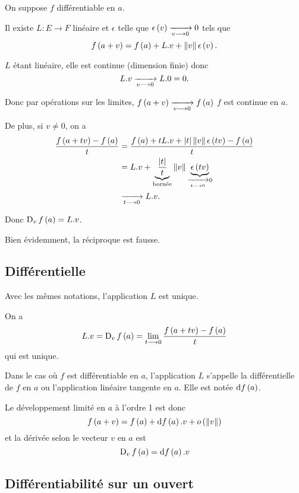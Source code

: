\begin{dem}
On suppose \(f\) différentiable en \(a\).

Il existe \(L:E\to F\) linéaire et \(\epsilon\) telle que \(\epsilon\left(v\right)\xrightarrow[v\longrightarrow0]{}0\) tels que \[f\paren{a+v}=f\paren{a}+L.v+\norme{v}\epsilon\paren{v}.\]

\(L\) étant linéaire, elle est continue (dimension finie) donc \[L.v\xrightarrow[v\longrightarrow0]{}L.0=0.\]

Donc par opérations sur les limites, \(f\left(a+v\right)\xrightarrow[v\longrightarrow0]{}f\left(a\right)\) \ie \(f\) est continue en \(a\).

De plus, si \(v\not=0\), on a \[\begin{aligned}
\dfrac{f\paren{a+tv}-f\paren{a}}{t}&=\dfrac{f\paren{a}+tL.v+\abs{t}\norme{v}\epsilon\paren{tv}-f\paren{a}}{t} \\
&=L.v+\underbrace{\dfrac{\abs{t}}{t}}_{\text{bornée}}\norme{v}\underbrace{\epsilon\paren{tv}}_{\tendqd{t\to0}0} \\
&\tendqd{t\to0}L.v.
\end{aligned}\]

Donc \(\operatorname{D}_{v}f\left(a\right)=L.v\).
\end{dem}

Bien évidemment, la réciproque est fausse.

\subsection{Différentielle}

\begin{prop}
Avec les mêmes notations, l'application \(L\) est unique.
\end{prop}

\begin{dem}
On a \[L.v=\operatorname{D}_{v}f\left(a\right)=\lim_{t\longrightarrow0}\dfrac{f\left(a+tv\right)-f\left(a\right)}{t}\] qui est unique.
\end{dem}

Dans le cas où \(f\) est différentiable en \(a\), l'application \(L\) s'appelle la différentielle de \(f\) en \(a\) ou l'application linéaire tangente en \(a\). Elle est notée \(\odif{f}\paren{a}\).

Le développement limité en \(a\) à l'ordre 1 est donc \[f\paren{a+v}=f\paren{a}+\odif{f}\paren{a}.v+\o{\norme{v}}\] et la dérivée selon le vecteur \(v\) en \(a\) est \[\vdv{v}{f}\paren{a}=\odif{f}\paren{a}.v\]

\subsection{Différentiabilité sur un ouvert}


